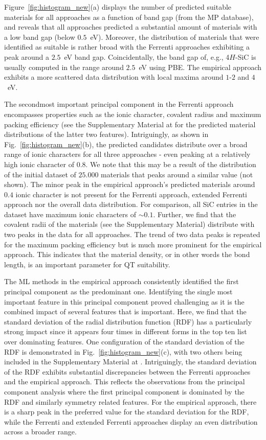 \documentclass[superscriptaddress,unsortedaddress,
 amsmath,amssymb,
 aps,
]{revtex4-2}
\begin{document}
Figure~\ref{fig:histogram_new}(a) displays the number of predicted suitable materials for all approaches as a function of band gap (from the MP database), and reveals that all approaches predicted a substantial amount of materials with a low band gap (below $0.5$~eV). Moreover, the distribution of materials that were identified as suitable is rather broad with the Ferrenti approaches exhibiting a peak around a $2.5$~eV band gap. 
Coincidentally, the band gap of, e.g., 4$H$-SiC is usually computed in the range around $2.5$~eV using PBE. 
The empirical approach exhibits a more scattered data distribution with local maxima around $1$-$2$ and $4$~eV. 

The secondmost important principal component in the Ferrenti approach encompasses properties such as the ionic character, covalent radius and maximum packing efficiency (see the Supplementary Material at \cite{supplementary} for the predicted material distributions of the latter two features).  
Intriguingly, as shown in Fig.~\ref{fig:histogram_new}(b), the predicted candidates distribute over a broad range of ionic characters for all three approaches - even peaking at a relatively high ionic character of $0.8$. 
We note that this may be a result of the distribution of the initial dataset of $25.000$ materials that peaks around a similar value (not shown). The minor peak in the empirical approach's predicted materials around $0.4$ ionic character is not present for the Ferrenti approach, extended Ferrenti approach nor the overall data distribution. For comparison, all SiC entries in the dataset have maximum ionic characters of $\sim 0.1$. 
Further, we find that the covalent radii of the materials (see the Supplementary Material) distribute with two peaks in the data for all approaches. 
The trend of two data peaks is repeated for the maximum packing efficiency but is much more prominent for the empirical approach. This indicates that the material density, or in other words the bond length, is an important parameter for QT suitability.  

The ML methods in the empirical approach consistently identified the first principal component as the predominant one. Identifying the single most important feature in this principal component proved challenging as it is the combined impact of several features that is important. 
Here, we find that the standard deviation of the radial distribution function (RDF) has a  particularly strong impact since it appears four times in different forms in the top ten list over dominating features. One configuration of the standard deviation of the RDF is demonstrated in Fig.~\ref{fig:histogram_new}(c), with two others being included in the Supplementary Material at \cite{supplementary}. Intriguingly, the standard deviation of the RDF exhibits substantial discrepancies between the Ferrenti approaches and the empirical approach. This reflects the observations from the principal component analysis where the first principal component is dominated by the RDF and similarly symmetry related features. For the empirical approach, there is a sharp peak in the preferred value for the standard deviation for the RDF, while the Ferrenti and extended Ferrenti approaches display an even distribution across a broader range. 
\end{document}
